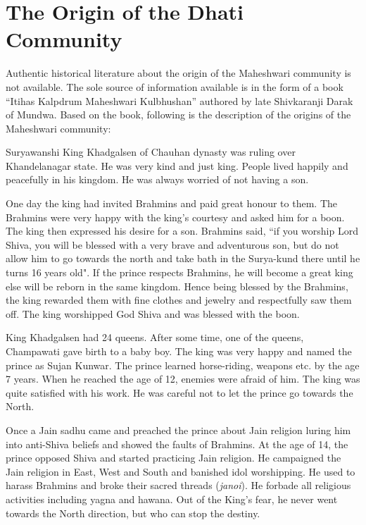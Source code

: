 \chapter{The Origin of the Dhati Community}
Authentic historical literature about the origin of the Maheshwari community is not available. The sole source of information available is in the form of a book ``Itihas Kalpdrum Maheshwari Kulbhushan'' authored by late Shivkaranji Darak of Mundwa. Based on the book, following is the description of the origins of the Maheshwari community:

Suryawanshi King Khadgalsen of Chauhan dynasty was ruling over Khandelanagar state. He was very kind and just king. People lived happily and peacefully in his kingdom. He was always worried of not having a son.

One day the king had invited Brahmins and paid great honour to them. The Brahmins were very happy with the king's courtesy and asked him for a boon. The king then expressed his desire for a son. Brahmins said, ``if you worship Lord Shiva, you will be blessed with a very brave and adventurous son, but do not allow him to go towards the north and take bath in the Surya-kund there until he turns 16 years old". If the prince respects Brahmins, he will become a great king else will be reborn in the same kingdom. Hence being blessed by the Brahmins, the king rewarded them with fine clothes and jewelry and respectfully saw them off. The king worshipped God Shiva and was blessed with the boon.

King Khadgalsen had 24 queens. After some time, one of the queens, Champawati gave birth to a baby boy. The king was very happy and named the prince as Sujan Kunwar. The prince learned horse-riding, weapons etc. by the age 7 years. When he reached the age of 12, enemies were afraid of him. The king was quite satisfied with his work. He was careful not to let the prince go towards the North.

Once a Jain sadhu came and preached the prince about Jain religion luring him into anti-Shiva beliefs and showed the faults of Brahmins. At the age of 14, the prince opposed Shiva and started practicing Jain religion. He campaigned the Jain religion in East, West and South and banished idol worshipping. He used to harass Brahmins and broke their sacred threads (\textit{janoi}). He forbade all religious activities including yagna and hawana. Out of the King's fear, he never went towards the North direction, but who can stop the destiny.


